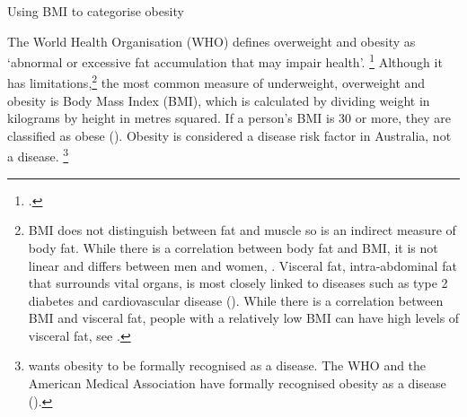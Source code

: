 \documentclass[embargoed]{grattan}
\begin{document}
\begin{table}%
\caption{Using BMI to categorise obesity}\label{tbl:using-BMI-to-categorise-obesity}



\end{table}

The World Health Organisation (WHO) defines overweight and obesity as `abnormal or excessive fat accumulation that may impair health'.%
\footcite{Organization2016ObesityoverweightFact} Although it has limitations,\footnote{BMI does not distinguish between fat and muscle so is an indirect measure of body fat.
While there is a correlation between body fat and BMI, it is not linear and differs between men and women, \textcite{Rothman2008BMIrelatederrors}.
Visceral fat, intra-abdominal fat that surrounds vital organs, is most closely linked to diseases such as type 2 diabetes and cardiovascular disease (\textcites{Mathieu2009Visceralobesitylink}{Despres2012Bodyfatdistribution}{Janiszewski2012WhyBodyMass}).
While there is a correlation between BMI and visceral fat, people with a relatively low BMI can have high levels of visceral fat, see \textcite{Rankinen1999predictionabdominalvisceral}.} 
the most common measure of underweight, overweight and obesity is Body Mass Index (BMI), which is calculated by dividing weight in kilograms by height in metres squared.
If a person's BMI is 30 or more, they are classified as obese ().
Obesity is considered a disease risk factor in Australia, not a disease.%
\footnote{\textcite{Australia2014NoTimeWeight} wants obesity to be formally recognised as a disease.
The WHO and the American Medical Association have formally recognised obesity as a disease (\textcites{Organisation2000Obesitypreventingmanaging}{Stoner2014DidAmericanMedical}{Australia2015NoTimeWeight}).}
\end{document}
